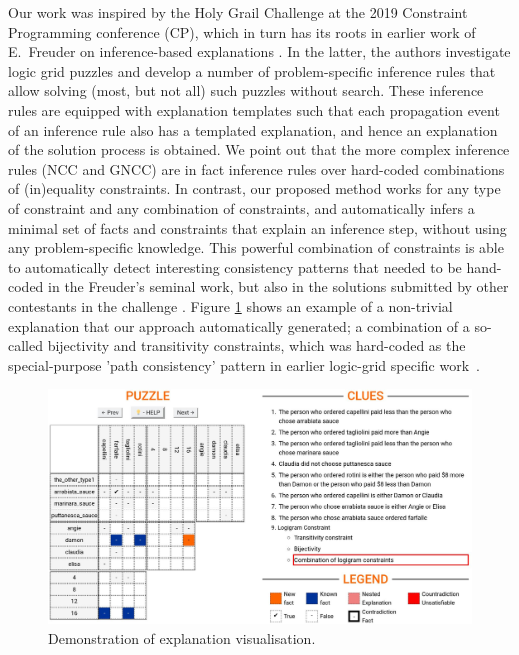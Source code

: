 Our work was inspired by the Holy Grail Challenge \cite{freuder2018progress} at the 2019 Constraint Programming conference (CP), which in turn has its roots in earlier work of E.~Freuder on inference-based explanations \cite{sqalli1996inference}.
In the latter, the authors investigate logic grid puzzles and develop a number of problem-specific inference rules that allow solving (most, but not all) such puzzles without search.
These inference rules are equipped with explanation templates such that each propagation event of an inference rule also has a templated explanation, and hence an explanation of the solution process is obtained.
We point out that the more complex inference rules (NCC and GNCC) are in fact inference rules over hard-coded combinations of (in)equality constraints.
In contrast, our proposed method works for any type of constraint and any combination of constraints, and automatically infers a minimal set of facts and constraints that explain an inference step, without using any problem-specific knowledge.
This powerful combination of constraints is able to automatically detect interesting consistency patterns that needed to be hand-coded in the Freuder's seminal work, but also in the solutions submitted by other
contestants in the challenge \cite{escamocher2019solving}.
Figure \ref{fig:zebrascreen:path} shows an example of a non-trivial explanation that our approach automatically generated; a combination of a so-called bijectivity and transitivity constraints, which was hard-coded as the special-purpose 'path consistency' pattern in earlier logic-grid specific work~\cite{sqalli1996inference}.


\begin{figure}[ht]
    \centering
    \includegraphics[width=0.9\linewidth]{figures/related_work.jpeg}
    \caption{Demonstration of explanation visualisation.}
    \label{fig:zebrascreen:path}
\end{figure}


